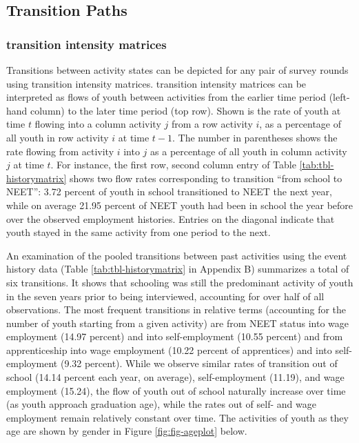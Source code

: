 \documentclass[
  11pt,
a4paper
]{article}
\begin{document}
\hypertarget{survey-paths}{%
\subsection{Transition Paths}\label{survey-paths}}

\hypertarget{transition-intensity-matrices}{%
\subsubsection*{transition intensity matrices}\label{transition-intensity-matrices}}

Transitions between activity states can be depicted for any pair of survey rounds using transition intensity matrices. transition intensity matrices can be interpreted as flows of youth between activities from the earlier time period (left-hand column) to the later time period (top row). Shown is the rate of youth at time \(t\) flowing into a column activity \(j\) from a row activity \(i\), as a percentage of all youth in row activity \(i\) at time \(t-1\). The number in parentheses shows the rate flowing from activity \(i\) into \(j\) as a percentage of all youth in column activity \(j\) at time \(t\). For instance, the first row, second column entry of Table \ref{tab:tbl-historymatrix} shows two flow rates corresponding to transition ``from school to NEET'': 3.72 percent of youth in school transitioned to NEET the next year, while on average 21.95 percent of NEET youth had been in school the year before over the observed employment histories. Entries on the diagonal indicate that youth stayed in the same activity from one period to the next.

An examination of the pooled transitions between past activities using the event history data (Table \ref{tab:tbl-historymatrix} in Appendix B) summarizes a total of six transitions. It shows that schooling was still the predominant activity of youth in the seven years prior to being interviewed, accounting for over half of all observations. The most frequent transitions in relative terms (accounting for the number of youth starting from a given activity) are from NEET status into wage employment (14.97 percent) and into self-employment (10.55 percent) and from apprenticeship into wage employment (10.22 percent of apprentices) and into self-employment (9.32 percent). While we observe similar rates of transition out of school (14.14 percent each year, on average), self-employment (11.19), and wage employment (15.24), the flow of youth out of school naturally increase over time (as youth approach graduation age), while the rates out of self- and wage employment remain relatively constant over time. The activities of youth as they age are shown by gender in Figure \ref{fig:fig-ageplot} below.
\end{document}
